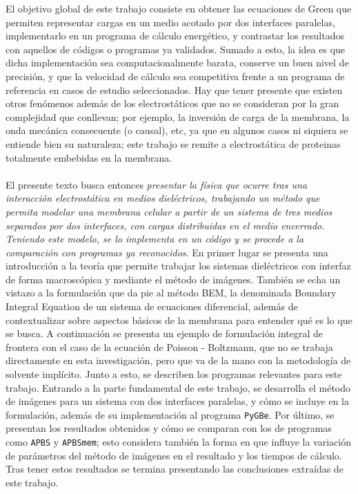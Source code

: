 \documentclass[12pt, oneside, numbers, spanish]{ezthesis}
\numberwithin{equation}{section}
\begin{document}
El objetivo global de este trabajo consiste en obtener las ecuaciones de Green que permiten representar cargas en un medio acotado por dos interfaces paralelas, implementarlo en un programa de cálculo energético, y contrastar los resultados con aquellos de códigos o programas ya validados. Sumado a esto, la idea es que dicha implementación sea computacionalmente barata, conserve un buen nivel de precisión, y que la velocidad de cálculo sea competitiva frente a un programa de referencia en casos de estudio seleccionados. Hay que tener presente que existen otros fenómenos además de los electrostáticos que no se consideran por la gran complejidad que conllevan; por ejemplo, la inversión de carga de la membrana, la onda mecánica consecuente (o causal), etc, ya que en algunos casos ni siquiera se entiende bien su naturaleza; este trabajo se remite a electrostática de proteinas totalmente embebidas en la membrana.\\\\
El presente texto busca entonces \textit{presentar la física que ocurre tras una interacción electrostática en medios dieléctricos, trabajando un método que permita modelar una membrana celular a partir de un sistema de tres medios separados por dos interfaces, con cargas distribuidas en el medio encerrado. Teniendo este modelo, se lo implementa en un código y se procede a la comparación con programas ya reconocidos}.
En primer lugar se presenta una introducción a la teoría que permite trabajar los sistemas dieléctricos con interfaz de forma macroscópica y mediante el método de imágenes. También se echa un vistazo a la formulación que da pie al método BEM, la denominada Boundary Integral Equation de un sistema de ecuaciones diferencial, además de contextualizar sobre aspectos básicos de la membrana para entender qué es lo que se busca. A continuación se presenta un ejemplo de formulación integral de frontera con el caso de la ecuación de Poisson - Boltzmann, que no se trabaja directamente en esta investigación, pero que va de la mano con la metodología de solvente implícito. Junto a esto, se describen los programas relevantes para este trabajo. Entrando a la parte fundamental de este trabajo, se desarrolla el método de imágenes para un sistema con dos interfaces paralelas, y cómo se incluye en la formulación, además de su implementación al programa \texttt{PyGBe}. Por último, se presentan los resultados obtenidos y cómo se comparan con los de programas como \texttt{APBS} y \texttt{APBSmem}; esto considera también la forma en que influye la variación de parámetros del método de imágenes en el resultado y los tiempos de cálculo. Tras tener estos resultados se termina presentando las conclusiones extraídas de este trabajo.
\end{document}
